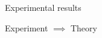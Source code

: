 \documentclass[xcolor=x11names,compress]{beamer}
\renewcommand{\(}{\begin{columns}}
\renewcommand{\)}{\end{columns}}
\newcommand{\<}[1]{\begin{column}{#1}}
\renewcommand{\>}{\end{column}}
\begin{document}
\begin{frame}[t]{Experimental results}
{    }
\end{frame}

\begin{frame}[t]{}
    \vspace{3.5cm}
    \huge Experiment \qquad $\implies$ \qquad Theory
\end{frame}
\end{document}

